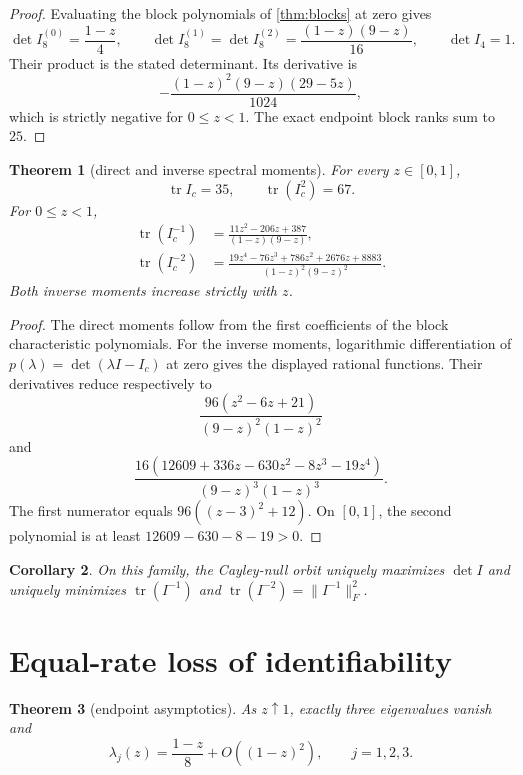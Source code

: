 \documentclass[11pt]{amsart}
\newtheorem{theorem}{Theorem}[section]
\newtheorem{corollary}[theorem]{Corollary}
\theoremstyle{remark}
\DeclareMathOperator{\tr}{tr}
\begin{document}
\begin{proof}
Evaluating the block polynomials of \cref{thm:blocks} at zero gives
\[
 \det I_8^{(0)}=\frac{1-z}{4},\qquad
 \det I_8^{(1)}=\det I_8^{(2)}=\frac{(1-z)(9-z)}{16},
 \qquad \det I_4=1.
\]
Their product is the stated determinant.  Its derivative is
\[
 -\frac{(1-z)^2(9-z)(29-5z)}{1024},
\]
which is strictly negative for $0\le z<1$.  The exact endpoint block ranks
sum to $25$.
\end{proof}

\begin{theorem}[direct and inverse spectral moments]\label{thm:moments}
For every $z\in[0,1]$,
\[
 \tr I_c=35,
 \qquad
 \tr(I_c^2)=67.
\]
For $0\le z<1$,
\begin{align*}
 \tr(I_c^{-1})
 &=\frac{11z^2-206z+387}{(1-z)(9-z)},\\
 \tr(I_c^{-2})
 &=\frac{19z^4-76z^3+786z^2+2676z+8883}
 {(1-z)^2(9-z)^2}.
\end{align*}
Both inverse moments increase strictly with $z$.
\end{theorem}

\begin{proof}
The direct moments follow from the first coefficients of the block
characteristic polynomials.  For the inverse moments, logarithmic
differentiation of $p(\lambda)=\det(\lambda I-I_c)$ at zero gives the displayed
rational functions.  Their derivatives reduce respectively to
\[
 \frac{96(z^2-6z+21)}{(9-z)^2(1-z)^2}
\]
and
\[
 \frac{16(12609+336z-630z^2-8z^3-19z^4)}
 {(9-z)^3(1-z)^3}.
\]
The first numerator equals $96((z-3)^2+12)$.  On $[0,1]$, the second
polynomial is at least $12609-630-8-19>0$.
\end{proof}

\begin{corollary}
On this family, the Cayley-null orbit uniquely maximizes $\det I$ and uniquely
minimizes $\tr(I^{-1})$ and
$\tr(I^{-2})=\lVert I^{-1}\rVert_F^2$.
\end{corollary}

\section{Equal-rate loss of identifiability}

\begin{theorem}[endpoint asymptotics]\label{thm:endpoint}
As $z\uparrow1$, exactly three eigenvalues vanish and
\[
 \lambda_j(z)=\frac{1-z}{8}+O((1-z)^2),\qquad j=1,2,3.
\]
\end{theorem}
\end{document}
